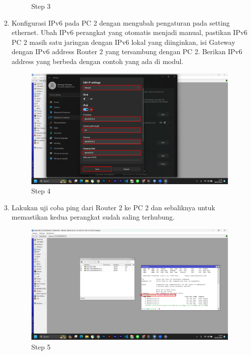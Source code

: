 \begin{center}
\begin{enumerate}
\begin{figure}[H]
			\caption{Step 3}
			\label{fig:Step 3(PC 2)}
		\end{figure}
        \item Konfigurasi IPv6 pada PC 2 dengan mengubah pengaturan pada setting ethernet. Ubah IPv6 perangkat yang otomatis menjadi manual, pastikan IPv6 PC 2 masih satu jaringan dengan IPv6 lokal yang diinginkan, isi Gateway dengan IPv6 address Router 2 yang tersambung dengan PC 2. Berikan IPv6 address yang berbeda dengan contoh yang ada di modul.
        \begin{figure}[H]
			\centering
			\includegraphics[width=0.8\linewidth]{P5/img/pc2/Step 4.png}
			\caption{Step 4}
			\label{fig:Step 4(PC 2)}
		\end{figure}
        \item Lakukan uji coba ping dari Router 2 ke PC 2 dan sebaliknya untuk memastikan kedua perangkat sudah saling terhubung.
        \begin{figure}[H]
			\centering
			\includegraphics[width=0.8\linewidth]{P5/img/pc2/Step 5.png}
			\caption{Step 5}
			\label{fig:Step 5(PC 2)}
		\end{figure}
    

\end{enumerate}
\end{center}
